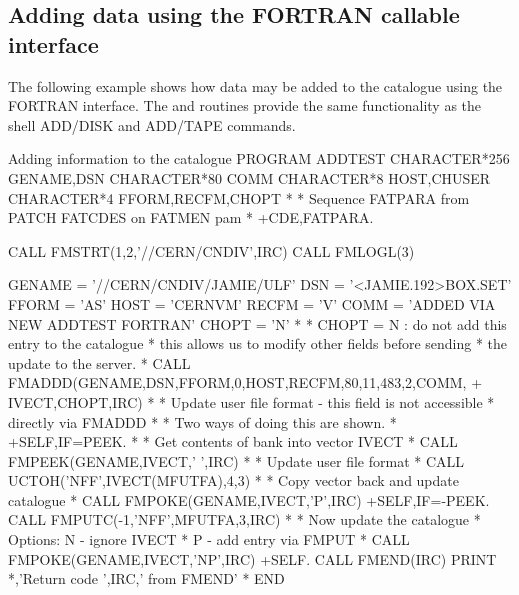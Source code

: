 \subsection{Adding data using the FORTRAN callable interface}
\par
The following example shows how data may be added to the
catalogue using the FORTRAN interface.
The  and  routines provide the same functionality
as the shell ADD/DISK and ADD/TAPE commands. 
\begin{XMPt}{Adding information to the catalogue}
      PROGRAM ADDTEST
      CHARACTER*256 GENAME,DSN
      CHARACTER*80  COMM
      CHARACTER*8   HOST,CHUSER
      CHARACTER*4   FFORM,RECFM,CHOPT
*
*     Sequence FATPARA from PATCH FATCDES on FATMEN pam
*
+CDE,FATPARA.

      CALL FMSTRT(1,2,'//CERN/CNDIV',IRC)
      CALL FMLOGL(3)
 
      GENAME = '//CERN/CNDIV/JAMIE/ULF'
      DSN    = '<JAMIE.192>BOX.SET'
      FFORM  = 'AS'
      HOST   = 'CERNVM'
      RECFM  = 'V'
      COMM   = 'ADDED VIA NEW ADDTEST FORTRAN'
      CHOPT  = 'N'
*
*     CHOPT = N : do not add this entry to the catalogue
*     this allows us to modify other fields before sending
*     the update to the server.
* 
      CALL FMADDD(GENAME,DSN,FFORM,0,HOST,RECFM,80,11,483,2,COMM,
     +            IVECT,CHOPT,IRC)
*
*     Update user file format - this field is not accessible
*     directly via FMADDD
*
*     Two ways of doing this are shown. 
*     
+SELF,IF=PEEK.
*
*     Get contents of bank into vector IVECT
*
      CALL FMPEEK(GENAME,IVECT,' ',IRC)
*
*     Update user file format
*
      CALL UCTOH('NFF',IVECT(MFUTFA),4,3)
*
*     Copy vector back and update catalogue
*
      CALL FMPOKE(GENAME,IVECT,'P',IRC)
+SELF,IF=-PEEK.
      CALL FMPUTC(-1,'NFF',MFUTFA,3,IRC)
*
*     Now update the catalogue
*         Options: N - ignore IVECT
*                  P - add entry via FMPUT
*
      CALL FMPOKE(GENAME,IVECT,'NP',IRC)
+SELF.
      CALL FMEND(IRC)
      PRINT *,'Return code ',IRC,' from FMEND'
*
      END
\end{XMPt}
